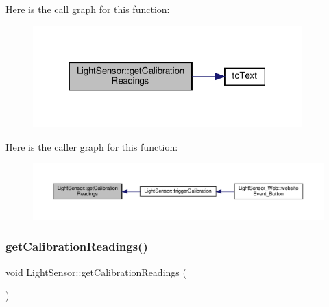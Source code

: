 Here is the call graph for this function\+:
\nopagebreak
\begin{figure}[H]
\begin{center}
\leavevmode
\includegraphics[width=294pt]{class_light_sensor_a73dea4504d64c13c43a5c68bee9aef27_cgraph}
\end{center}
\end{figure}
Here is the caller graph for this function\+:
\nopagebreak
\begin{figure}[H]
\begin{center}
\leavevmode
\includegraphics[width=350pt]{class_light_sensor_a73dea4504d64c13c43a5c68bee9aef27_icgraph}
\end{center}
\end{figure}
\mbox{\label{class_light_sensor_a73dea4504d64c13c43a5c68bee9aef27}} 
\subsubsection{\texorpdfstring{get\+Calibration\+Readings()}{getCalibrationReadings()}\hspace{0.1cm}{\footnotesize\ttfamily [2/2]}}
{\footnotesize\ttfamily void Light\+Sensor\+::get\+Calibration\+Readings (\begin{DoxyParamCaption}{ }\end{DoxyParamCaption})}

\mbox{\label{class_light_sensor_a06881cb787b1968daf4d1a49923617fe}} 
